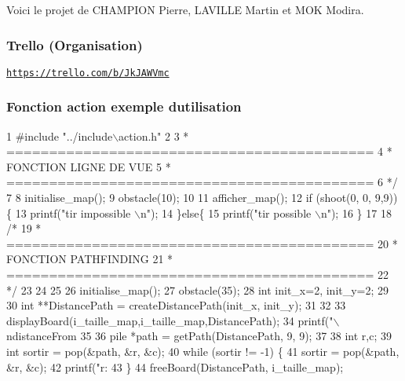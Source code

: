 Voici le projet de C\+H\+A\+M\+P\+I\+O\+N Pierre, L\+A\+V\+I\+L\+L\+E Martin et M\+O\+K Modira.

\subsubsection*{Trello (Organisation)}

\href{https://trello.com/b/JkJAWVmc}{\tt https\+://trello.\+com/b/\+Jk\+J\+A\+W\+Vmc}

\subsubsection*{Fonction action exemple d\textquotesingle{}utilisation}


\begin{DoxyCode}
1 #include "../include\(\backslash\)action.h"
2 
3 * ===========================================
4 *            FONCTION LIGNE DE VUE
5 * ===========================================
6 */
7 
8 initialise\_map();
9 obstacle(10);
10 
11 afficher\_map();
12 if (shoot(0, 0, 9,9)) \{
13     printf("tir impossible \(\backslash\)n");
14 \}else\{
15     printf("tir possible \(\backslash\)n");
16 \}
17 
18 /*
19 * ===========================================
20 *            FONCTION PATHFINDING
21 * ===========================================
22 */
23 
24 
25 
26 initialise\_map();
27 obstacle(35);
28 int init\_x=2, init\_y=2;
29 
30 int **DistancePath = createDistancePath(init\_x, init\_y);
31 
32 
33 displayBoard(i\_taille\_map,i\_taille\_map,DistancePath);
34 printf("\(\backslash\)ndistanceFrom %
35 
36 pile *path = getPath(DistancePath, 9, 9);
37 
38 int r,c;
39 int sortir = pop(&path, &r, &c);
40 while (sortir != -1) \{
41     sortir = pop(&path, &r, &c);
42     printf("r: %
43 \}
44 freeBoard(DistancePath, i\_taille\_map);
\end{DoxyCode}
 